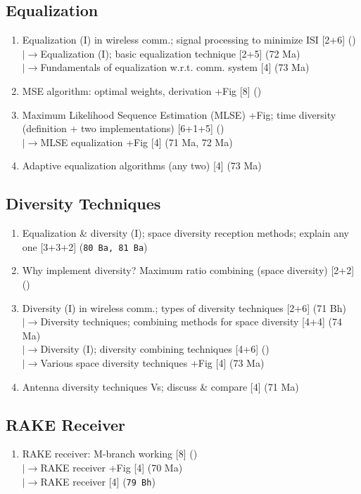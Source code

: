 \documentclass[12pt]{article}
\newcommand{\lb}{\\$\left|\rightarrow\right.$}
\begin{document}
  \subsection{Equalization}
    \begin{enumerate}[topsep=0pt, noitemsep]
      \item Equalization (I) in wireless comm.; signal processing to minimize ISI \hfill [2+6] ()
        \lb Equalization (I); basic equalization technique \hfill [2+5] (72 Ma)
        \lb Fundamentals of equalization w.r.t. comm. system \hfill [4] (73 Ma)
      \item MSE algorithm: optimal weights, derivation +Fig \hfill [8] ()
      \item Maximum Likelihood Sequence Estimation (MLSE) +Fig;
        time diversity (definition + two implementations) \hfill [6+1+5] ()
        \lb MLSE equalization +Fig \hfill [4] (71 Ma, 72 Ma)
      \item Adaptive equalization algorithms (any two) \hfill [4] (73 Ma)
    \end{enumerate}

  \subsection{Diversity Techniques}
    \begin{enumerate}[topsep=0pt, noitemsep]
      \item Equalization \& diversity (I); space diversity reception methods;
        explain any one \hfill [3+3+2] (\texttt{80 Ba, 81 Ba})
      \item Why implement diversity? Maximum ratio combining (space diversity) \hfill [2+2] ()
      \item Diversity (I) in wireless comm.; types of diversity techniques \hfill [2+6] (71 Bh)
        \lb Diversity techniques; combining methods for space diversity \hfill [4+4] (74 Ma)
        \lb Diversity (I); diversity combining techniques \hfill [4+6] ()
        \lb Various space diversity techniques +Fig \hfill [4] (73 Ma)
      \item Antenna diversity techniques Vs; discuss \& compare \hfill [4] (71 Ma)
    \end{enumerate}

  \subsection{RAKE Receiver}
    \begin{enumerate}[topsep=0pt, noitemsep]
      \item RAKE receiver: M-branch working \hfill [8] ()
        \lb RAKE receiver +Fig \hfill [4] (70 Ma)
        \lb RAKE receiver \hfill [4] (\texttt{79 Bh})
    \end{enumerate}
\end{document}
